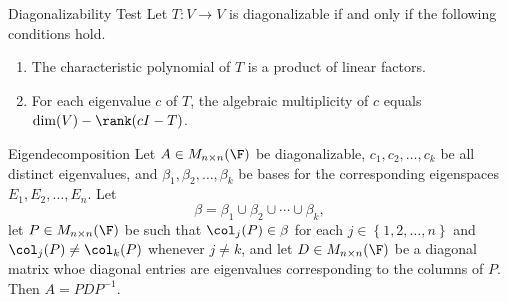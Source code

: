 \documentclass[linearalgebraI]{subfiles}
\begin{document}
    \begin{prop}{Diagonalizability Test}
        Let $T:V\to V$ is diagonalizable if and only if the following conditions hold.
        \begin{enumerate}
            \item The characteristic polynomial of $T$ is a product of linear factors.
            \item For each eigenvalue $c$ of $T$, the algebraic multiplicity of $c$ equals $\dim(V)-\rank(cI-T)$.
        \end{enumerate}
    \end{prop}

    \clearpage
    \begin{prop}{Eigendecomposition}
        Let $A\in M_{n\times n}(\F)$ be diagonalizable, $c_1, c_2, \ldots, c_k$ be all distinct eigenvalues, and $\beta_1, \beta_2, \ldots, \beta_k$ be bases for the corresponding eigenspaces $E_1, E_2, \ldots, E_n$. Let
        \begin{equation*}
            \beta = \beta_1\cup\beta_2\cup\cdots\cup\beta_k,
        \end{equation*}
        let $P\in M_{n\times n}(\F)$ be such that $\col_j(P)\in \beta$ for each $j\in \left\lbrace 1, 2, \ldots, n \right\rbrace$ and $\col_j(P)\neq \col_k(P)$ whenever $j\neq k$, and let $D\in M_{n\times n}(\F)$ be a diagonal matrix whoe diagonal entries are eigenvalues corresponding to the columns of $P$. Then $A = PDP^{-1}$.
    \end{prop}
\end{document}
